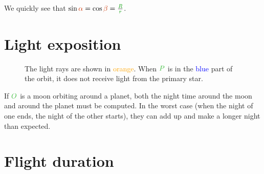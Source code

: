 We quickly see that $\sin \angle{\alpha} = \cos \angle{\beta} = \frac
{\dist{R}} {\dist{r}}$.



\section{Light exposition}

\begin{figure}[H]
\centering
{}
\caption{
	The light rays are shown in \textcolor{orange}{orange}.
	When $\posit{P}$ is in the \textcolor{blue}{blue}
	part of the orbit, it does not receive light from the
	primary star.
}
\end{figure}

\begin{important}
If $\posit{O}$ is a moon orbiting around a planet, both the night time
around the moon and around the planet must be computed. In the worst case
(when the night of one ends, the night of the other starts), they can
add up and make a longer night than expected.
\end{important}



\section{Flight duration}

